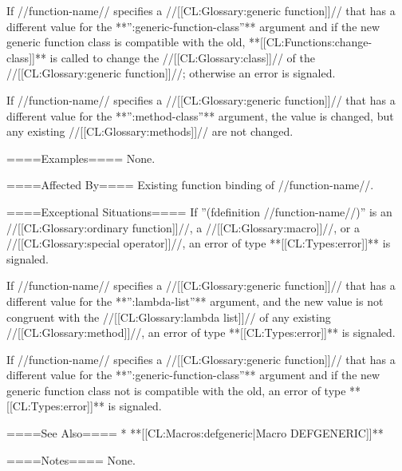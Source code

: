 If //function-name// specifies a //[[CL:Glossary:generic function]]// that has a different value for the **'':generic-function-class''** argument and if the new generic function class is compatible with the old, **[[CL:Functions:change-class]]** is called to change the //[[CL:Glossary:class]]// of the //[[CL:Glossary:generic function]]//; otherwise an error is signaled.

If //function-name// specifies a //[[CL:Glossary:generic function]]// that has a different value for the **'':method-class''** argument, the value is changed, but any existing //[[CL:Glossary:methods]]// are not changed.

====Examples====
None.

====Affected By====
Existing function binding of //function-name//.

====Exceptional Situations====
If ''(fdefinition //function-name//)'' is an //[[CL:Glossary:ordinary function]]//, a //[[CL:Glossary:macro]]//, or a //[[CL:Glossary:special operator]]//, an error of type **[[CL:Types:error]]** is signaled.

If //function-name// specifies a //[[CL:Glossary:generic function]]// that has a different value for the **'':lambda-list''** argument, and the new value is not congruent with the //[[CL:Glossary:lambda list]]// of any existing //[[CL:Glossary:method]]//, an error of type **[[CL:Types:error]]** is signaled.

If //function-name// specifies a //[[CL:Glossary:generic function]]// that has a different value for the **'':generic-function-class''** argument and if the new generic function class not is compatible with the old, an error of type **[[CL:Types:error]]** is signaled.

====See Also====
  * **[[CL:Macros:defgeneric|Macro DEFGENERIC]]**

====Notes====
None.

 
